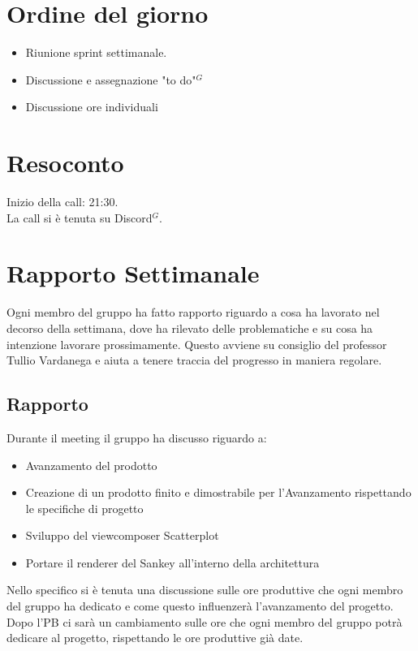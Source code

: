 \section{Ordine del giorno}

\begin{itemize}
	\item Riunione sprint settimanale.
    \item Discussione e assegnazione "to do"$^{G}$ 
    \item Discussione ore individuali
\end{itemize}

\section{Resoconto}

\noindent
Inizio della call: 21:30. \\
\noindent La call si è tenuta su Discord$^{G}$.
\section{Rapporto Settimanale}
Ogni membro del gruppo ha fatto rapporto riguardo a cosa ha lavorato nel decorso della settimana, dove ha rilevato delle problematiche e su cosa ha intenzione lavorare prossimamente.
Questo avviene su consiglio del professor Tullio Vardanega e aiuta a tenere traccia del progresso in maniera regolare.

\subsection{Rapporto}
Durante il meeting il gruppo ha discusso riguardo a:
\begin{itemize}
	\item Avanzamento del prodotto 
	\item Creazione di un prodotto finito e dimostrabile per l'Avanzamento rispettando le specifiche di progetto
	\item Sviluppo del viewcomposer Scatterplot
	\item Portare il renderer del Sankey all'interno della architettura
\end{itemize}
Nello specifico si è tenuta una discussione sulle ore produttive che ogni membro del gruppo ha dedicato
e come questo influenzerà l'avanzamento del progetto. Dopo l'PB ci sarà un cambiamento sulle ore che ogni membro
del gruppo potrà dedicare al progetto, rispettando le ore produttive già date.

